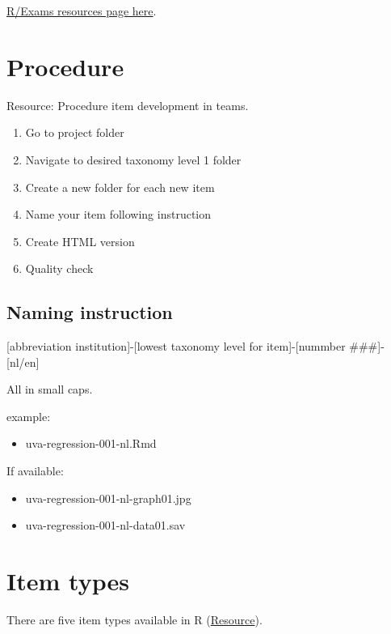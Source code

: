 \documentclass[
]{article}
\providecommand{\tightlist}{%
  \setlength{\itemsep}{0pt}\setlength{\parskip}{0pt}}
\begin{document}
\href{http://www.r-exams.org/resources/}{R/Exams resources page here}.

\hypertarget{procedure}{%
\section{Procedure}\label{procedure}}

Resource: Procedure item development in teams.

\begin{enumerate}
\def\labelenumi{\arabic{enumi}.}
\tightlist
\item
  Go to project folder
\item
  Navigate to desired taxonomy level 1 folder
\item
  Create a new folder for each new item
\item
  Name your item following instruction
\item
  Create HTML version
\item
  Quality check
\end{enumerate}

\hypertarget{naming-instruction}{%
\subsection{Naming instruction}\label{naming-instruction}}

{[}abbreviation institution{]}-{[}lowest taxonomy level for
item{]}-{[}nummber \#\#\#{]}-{[}nl/en{]}

All in small caps.

example:

\begin{itemize}
\tightlist
\item
  uva-regression-001-nl.Rmd
\end{itemize}

If available:

\begin{itemize}
\tightlist
\item
  uva-regression-001-nl-graph01.jpg
\item
  uva-regression-001-nl-data01.sav
\end{itemize}

\hypertarget{item-types}{%
\section{Item types}\label{item-types}}

There are five item types available in R
(\href{http://www.r-exams.org/intro/dynamic/}{Resource}).
\end{document}
